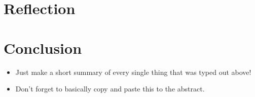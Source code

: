 \documentclass{article}
\begin{document}
\section{Reflection}


\section{Conclusion}
\begin{itemize}
    \item Just make a short summary of every single thing that was typed out above!
    \item Don't forget to basically copy and paste this to the abstract.
\end{itemize}

\newpage


\end{document}
